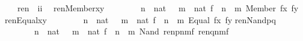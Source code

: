 \begin{isabellebody}
%
\isatagdocument
%
\isamarkuptrue%
%
\endisatagdocument
{\isafolddocument}%
%
\isadelimdocument
%
\endisadelimdocument
{}\isamarkupfalse%
\ \ \ ren\ {\isacharcolon}{\kern0pt}{\isacharcolon}{\kern0pt}\ {\isachardoublequoteopen}i{\isasymRightarrow}i{\isachardoublequoteclose}\isanewline
{}\isamarkupfalse%
\isanewline
\ \ {\isachardoublequoteopen}ren{\isacharparenleft}{\kern0pt}Member{\isacharparenleft}{\kern0pt}x{\isacharcomma}{\kern0pt}y{\isacharparenright}{\kern0pt}{\isacharparenright}{\kern0pt}\ {\isacharequal}{\kern0pt}\isanewline
\ \ \ \ \ \ {\isacharparenleft}{\kern0pt}{\isasymlambda}\ n\ {\isasymin}\ nat\ {\isachardot}{\kern0pt}\ {\isasymlambda}\ m\ {\isasymin}\ nat{\isachardot}{\kern0pt}\ {\isasymlambda}f\ {\isasymin}\ n\ {\isasymrightarrow}\ m{\isachardot}{\kern0pt}\ Member\ {\isacharparenleft}{\kern0pt}f{\isacharbackquote}{\kern0pt}x{\isacharcomma}{\kern0pt}\ f{\isacharbackquote}{\kern0pt}y{\isacharparenright}{\kern0pt}{\isacharparenright}{\kern0pt}{\isachardoublequoteclose}\isanewline
\isanewline
{\isachardoublequoteopen}ren{\isacharparenleft}{\kern0pt}Equal{\isacharparenleft}{\kern0pt}x{\isacharcomma}{\kern0pt}y{\isacharparenright}{\kern0pt}{\isacharparenright}{\kern0pt}\ {\isacharequal}{\kern0pt}\isanewline
\ \ \ \ \ \ {\isacharparenleft}{\kern0pt}{\isasymlambda}\ n\ {\isasymin}\ nat\ {\isachardot}{\kern0pt}\ {\isasymlambda}\ m\ {\isasymin}\ nat{\isachardot}{\kern0pt}\ {\isasymlambda}f\ {\isasymin}\ n\ {\isasymrightarrow}\ m{\isachardot}{\kern0pt}\ Equal\ {\isacharparenleft}{\kern0pt}f{\isacharbackquote}{\kern0pt}x{\isacharcomma}{\kern0pt}\ f{\isacharbackquote}{\kern0pt}y{\isacharparenright}{\kern0pt}{\isacharparenright}{\kern0pt}{\isachardoublequoteclose}\isanewline
\isanewline
{\isachardoublequoteopen}ren{\isacharparenleft}{\kern0pt}Nand{\isacharparenleft}{\kern0pt}p{\isacharcomma}{\kern0pt}q{\isacharparenright}{\kern0pt}{\isacharparenright}{\kern0pt}\ {\isacharequal}{\kern0pt}\isanewline
\ \ \ \ \ \ {\isacharparenleft}{\kern0pt}{\isasymlambda}\ n\ {\isasymin}\ nat\ {\isachardot}{\kern0pt}\ {\isasymlambda}\ m\ {\isasymin}\ nat{\isachardot}{\kern0pt}\ {\isasymlambda}f\ {\isasymin}\ n\ {\isasymrightarrow}\ m{\isachardot}{\kern0pt}\ Nand\ {\isacharparenleft}{\kern0pt}ren{\isacharparenleft}{\kern0pt}p{\isacharparenright}{\kern0pt}{\isacharbackquote}{\kern0pt}n{\isacharbackquote}{\kern0pt}m{\isacharbackquote}{\kern0pt}f{\isacharcomma}{\kern0pt}\ ren{\isacharparenleft}{\kern0pt}q{\isacharparenright}{\kern0pt}{\isacharbackquote}{\kern0pt}n{\isacharbackquote}{\kern0pt}m{\isacharbackquote}{\kern0pt}f{\isacharparenright}{\kern0pt}{\isacharparenright}{\kern0pt}{\isachardoublequoteclose}\isanewline

\end{isabellebody}
